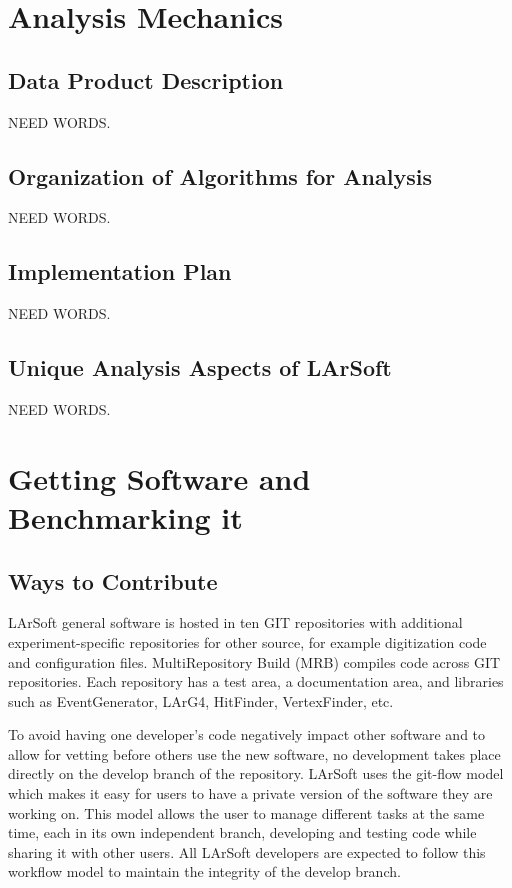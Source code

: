 \documentclass[12pt]{elsarticle}
\begin{document}
               
\section{Analysis Mechanics}

\subsection{Data Product Description}
NEED WORDS.

\subsection{Organization of Algorithms for Analysis}
NEED WORDS.

\subsection{Implementation Plan}
NEED WORDS.

\subsection{Unique Analysis Aspects of LArSoft}
NEED WORDS.

\section{Getting Software and Benchmarking it}
\subsection{Ways to Contribute}

LArSoft general software is hosted in ten GIT repositories with additional experiment-specific repositories for other source, for example digitization code and configuration files. MultiRepository Build (MRB) compiles code across GIT repositories. Each repository has a test area, a documentation area, and libraries such as EventGenerator, LArG4, HitFinder, VertexFinder, etc.\cite{gian}

To avoid having one developer's code negatively impact other software and to allow for vetting before others use the new software, no development takes place directly on the develop branch of the repository. LArSoft uses the git-flow\cite{git-flow} model which makes it easy for users to have a private version of the software they are working on. This model allows the user to manage different tasks at the same time, each in its own independent branch, developing and testing code while sharing it with other users.\cite{git-control} All LArSoft developers are expected to follow this workflow model to maintain the integrity of the develop branch.
\end{document}
